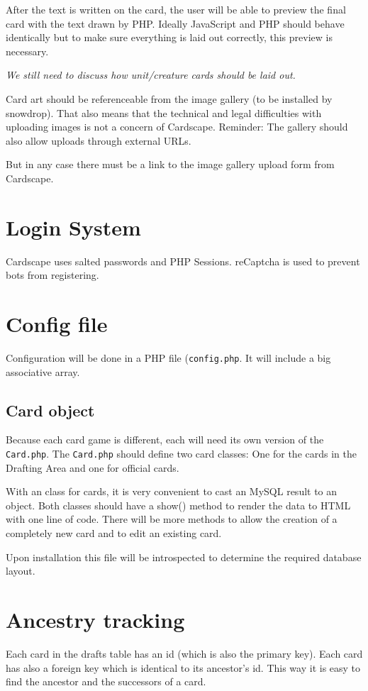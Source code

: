 \documentclass[a4paper, 11pt]{scrbook}
\begin{document}
After the text is written on the card, the user will be able to preview the final card with the text drawn by PHP. Ideally JavaScript and PHP should behave identically but to make sure everything is laid out correctly, this preview is necessary.

\emph{We still need to discuss how unit/creature cards should be laid out.}

Card art should be referenceable from the image gallery (to be installed by snowdrop). That also means that the technical and legal difficulties with uploading images is not a concern of Cardscape. Reminder: The gallery should also allow uploads through external URLs.

But in any case there must be a link to the image gallery upload form from Cardscape.

\section{Login System}
Cardscape uses salted passwords and PHP Sessions. reCaptcha is used to prevent bots from registering.

\section{Config file}
Configuration will be done in a PHP file (\texttt{config.php}. It will include a big associative array.

\subsection{Card object}
Because each card game is different, each will need its own version of the \texttt{Card.php}. The \texttt{Card.php} should define two card classes: One for the cards in the Drafting Area and one for official cards.

With an class for cards, it is very convenient to cast an MySQL result to an object. Both classes should have a show() method to render the data to HTML with one line of code. There will be more methods to allow the creation of a completely new card and to edit an existing card.

Upon installation this file will be introspected to determine the required database layout.

\section{Ancestry tracking}
Each card in the drafts table has an id (which is also the primary key). Each card has also a foreign key which is identical to its ancestor's id. This way it is easy to find the ancestor and the successors of a card.
\end{document}
